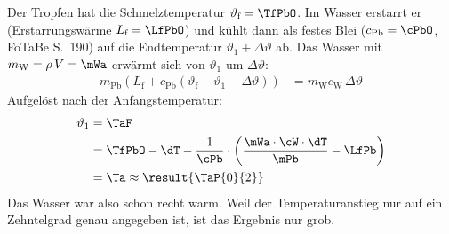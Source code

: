 Der Tropfen hat die Schmelztemperatur $\vartheta_\text{f} = \TfPbO$. Im Wasser erstarrt er (Erstarrungswärme $L_\text{f} = \LfPbO$) und kühlt dann als festes Blei ($c_\text{Pb} = \cPbO$, FoTaBe S.~190) auf die Endtemperatur $\vartheta_1+\Delta\vartheta$ ab. Das Wasser mit $m_\text{W} = \rho\,V = \mWa$ erwärmt sich von $\vartheta_1$ um $\Delta\vartheta$:
\begin{align}
 m_\text{Pb}\left(L_\text{f}+c_\text{Pb}\left(\vartheta_\text{f}-\vartheta_1-\Delta\vartheta\right)\right) &= m_\text{W}c_\text{W}\,\Delta\vartheta
\end{align}
Aufgelöst nach der Anfangstemperatur:
\begin{align}
 \vartheta_1 &= \TaF \\
   &= \TfPbO-\dT-\frac{1}{\cPb}\cdot\left(\frac{\mWa\cdot\cW\cdot\dT}{\mPb}-\LfPb\right) \\
   &= \Ta \approx \result{\TaP{0}{2}}
\end{align}
Das Wasser war also schon recht warm. Weil der Temperaturanstieg nur auf ein Zehntelgrad genau angegeben ist, ist das Ergebnis nur grob.
